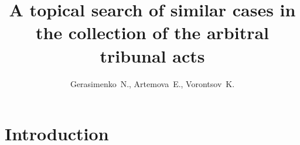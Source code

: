 \documentclass[12pt,twoside]{article}
\title
    [A topical search of similar cases in the collection of the arbitral tribunal acts] %
    {A topical search of similar cases in the collection of the arbitral tribunal acts}
\author
    [Gerasimenko~N.] %
    {Gerasimenko~N., Artemova~E., Vorontsov~K.} %
    [Gerasimenko~N.$^1$, Artemova~E.$^2$, Vorontsov~K.$^3$] %
\begin{document}
\maketitle
\section{Introduction}
\end{document}
